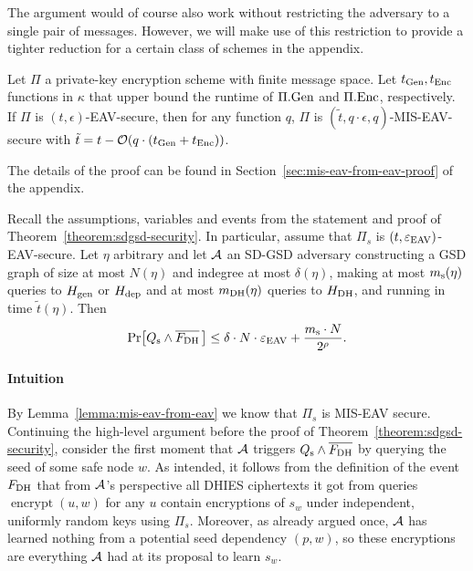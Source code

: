The argument would of course also work without restricting the adversary to a single pair of messages. However, we will make use of this restriction to provide a tighter reduction for a certain class of schemes in the appendix.

\begin{lemma} \label{lemma:mis-eav-from-eav}
	Let $\Pi$ a private-key encryption scheme with finite message space. Let $t_{\mathrm{Gen}}, t_{\mathrm{Enc}}$ functions in $\kappa$ that upper bound the runtime of $\Pi.\mathrm{Gen}$ and $\Pi.\mathrm{Enc}$, respectively. If $\Pi$ is $(t, \epsilon)$-EAV-secure, then for any function $q$, $\Pi$ is $(\tilde{t}, q \cdot \epsilon, q)$-MIS-EAV-secure with $\tilde{t} = t - \mathcal{O}(q \cdot (t_{\mathrm{Gen}} + t_{\mathrm{Enc}}))$.
\end{lemma}

The details of the proof can be found in Section~\ref{sec:mis-eav-from-eav-proof} of the appendix.

\begin{lemma} \label{lemma:eav-reduction}
	Recall the assumptions, variables and events from the statement and proof of Theorem~\ref{theorem:sdgsd-security}. In particular, assume that $\Pi_s$ is $(t, \varepsilon_\mathrm{EAV})$-EAV-secure. Let $\eta$ arbitrary and let $\mathcal{A}$ an SD-GSD adversary constructing a GSD graph of size at most $N(\eta)$ and indegree at most $\delta(\eta)$, making at most $m_\mathrm{s}(\eta)$ queries to $H_\mathrm{gen}$ or $H_\mathrm{dep}$ and at most $m_\mathrm{DH}(\eta)$ queries to $H_\mathrm{DH}$, and running in time $\tilde{t}(\eta)$. Then
	\[
		\pr{\qs \land \overline{\fdh} \,} \le \delta \cdot N \cdot \eeav + \frac{\ms \cdot N}{2^\rho}.
	\]
\end{lemma}

\paragraph{Intuition} By Lemma~\ref{lemma:mis-eav-from-eav} we know that $\Pi_s$ is MIS-EAV secure. Continuing the high-level argument before the proof of Theorem~\ref{theorem:sdgsd-security}, consider the first moment that $\mathcal{A}$ triggers $Q_\mathrm{s} \land \overline{F_\mathrm{DH}}$ by querying the seed of some safe node $w$.  As intended, it follows from the definition of the event $F_\mathrm{DH}$ that from $\mathcal{A}$'s perspective all DHIES ciphertexts it got from queries $\operatorname{encrypt}(u, w)$ for any $u$ contain encryptions of $s_w$ under independent, uniformly random keys using $\Pi_s$. Moreover, as already argued once, $\mathcal{A}$ has learned nothing from a potential seed dependency $(p, w)$, so these encryptions are everything $\mathcal{A}$ had at its proposal to learn $s_w$.

